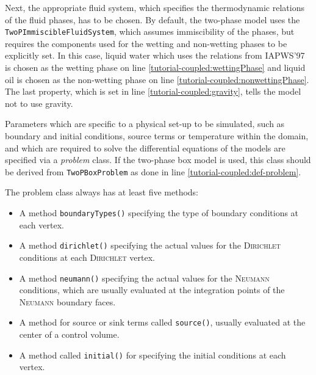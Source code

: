 Next, the appropriate fluid system, which specifies the thermodynamic
relations of the fluid phases, has to be chosen. By default, the
two-phase model uses the \texttt{TwoPImmiscibleFluidSystem}, which
assumes immiscibility of the phases, but requires the components
used for the wetting and non-wetting phases to be explicitly set. In
this case, liquid water which uses the relations from
IAPWS'97~\cite{IAPWS1997} is chosen as the wetting phase on line
\ref{tutorial-coupled:wettingPhase} and liquid oil is chosen as the
non-wetting phase on line \ref{tutorial-coupled:nonwettingPhase}. The
last property, which is set in line \ref{tutorial-coupled:gravity},
tells the model not to use gravity.

\label{tutorial-coupled:boundaryStart}Parameters which are specific to a physical set-up to be simulated,
such as boundary and initial conditions, source terms or temperature
within the domain, and which are required to solve the differential
equations of the models are specified via a \textit{problem} class. If
the two-phase box model is used, this class should be derived from
\texttt{TwoPBoxProblem} as done in line
\ref{tutorial-coupled:def-problem}.

The problem class always has at least five methods:
\begin{itemize}
\item A method \texttt{boundaryTypes()} specifying the type of
  boundary conditions at each vertex.
\item A method \texttt{dirichlet()} specifying the actual values for
  the \textsc{Dirichlet} conditions at each \textsc{Dirichlet} vertex.
\item A method \texttt{neumann()} specifying the actual values for
  the \textsc{Neumann} conditions, which are usually evaluated at the 
  integration points of the \textsc{Neumann} boundary faces.
\item A method for source or sink terms called \texttt{source()}, usually evaluated at
  the center of a control volume.
\item A method called \texttt{initial()} for specifying the initial
  conditions at each vertex.
\end{itemize}

